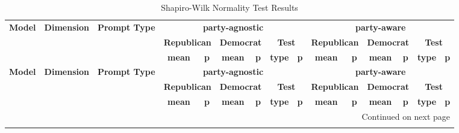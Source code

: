 
\begin{center}

\setlength{\LTleft}{3pt}
\setlength{\LTright}{0pt}
\setlength{\tabcolsep}{4pt}

\begin{longtable}{@{}lll|cccccc|cccccc@{}}

\caption{Shapiro-Wilk Normality Test Results}
\label{tab:no_persona_normality_big}\\

\toprule
\multirow{3}{*}{\textbf{Model}} &
\multirow{3}{*}{\textbf{Dimension}} &
\multirow{3}{*}{\textbf{Prompt Type}} &
\multicolumn{6}{c}{\textbf{party-agnostic}} &
\multicolumn{6}{c}{\textbf{party-aware}} \\
\cmidrule(lr){4-9} \cmidrule(lr){10-15}
& & &
\multicolumn{2}{c}{\textbf{Republican}} &
\multicolumn{2}{c}{\textbf{Democrat}} &
\multicolumn{2}{c}{\textbf{Test}} &
\multicolumn{2}{c}{\textbf{Republican}} &
\multicolumn{2}{c}{\textbf{Democrat}} &
\multicolumn{2}{c}{\textbf{Test}} \\
\cmidrule(lr){4-5} \cmidrule(lr){6-7} \cmidrule(lr){8-9} \cmidrule(lr){10-11} \cmidrule(lr){12-13} \cmidrule(lr){14-15}
& & &
\textbf{mean} & \textbf{p} &
\textbf{mean} & \textbf{p} &
\textbf{type} & \textbf{p} &
\textbf{mean} & \textbf{p} &
\textbf{mean} & \textbf{p} &
\textbf{type} & \textbf{p} \\
\midrule
\endfirsthead

\toprule
\multirow{3}{*}{\textbf{Model}} &
\multirow{3}{*}{\textbf{Dimension}} &
\multirow{3}{*}{\textbf{Prompt Type}} &
\multicolumn{6}{c}{\textbf{party-agnostic}} &
\multicolumn{6}{c}{\textbf{party-aware}} \\
\cmidrule(lr){4-9} \cmidrule(lr){10-15}
& & &
\multicolumn{2}{c}{\textbf{Republican}} &
\multicolumn{2}{c}{\textbf{Democrat}} &
\multicolumn{2}{c}{\textbf{Test}} &
\multicolumn{2}{c}{\textbf{Republican}} &
\multicolumn{2}{c}{\textbf{Democrat}} &
\multicolumn{2}{c}{\textbf{Test}} \\
\cmidrule(lr){4-5} \cmidrule(lr){6-7} \cmidrule(lr){8-9} \cmidrule(lr){10-11} \cmidrule(lr){12-13} \cmidrule(lr){14-15}
& & &
\textbf{mean} & \textbf{p} &
\textbf{mean} & \textbf{p} &
\textbf{type} & \textbf{p} &
\textbf{mean} & \textbf{p} &
\textbf{mean} & \textbf{p} &
\textbf{type} & \textbf{p} \\
\midrule
\endhead

\midrule
\multicolumn{15}{r}{\small Continued on next page}\\
\endfoot


\end{longtable}
\end{center}
